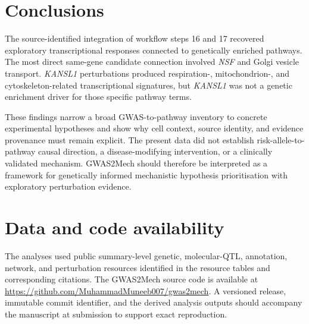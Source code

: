 \documentclass[11pt,a4paper]{article}
\begin{document}
\section{Conclusions}\label{subsec:discussion_conclusion}
The source-identified integration of workflow steps 16 and 17 recovered exploratory transcriptional responses connected to genetically enriched pathways. The most direct same-gene candidate connection involved \textit{NSF} and Golgi vesicle transport. \textit{KANSL1} perturbations produced respiration-, mitochondrion-, and cytoskeleton-related transcriptional signatures, but \textit{KANSL1} was not a genetic enrichment driver for those specific pathway terms.

These findings narrow a broad GWAS-to-pathway inventory to concrete experimental hypotheses and show why cell context, source identity, and evidence provenance must remain explicit. The present data did not establish risk-allele-to-pathway causal direction, a disease-modifying intervention, or a clinically validated mechanism. GWAS2Mech should therefore be interpreted as a framework for genetically informed mechanistic hypothesis prioritisation with exploratory perturbation evidence.

\section*{Data and code availability}
The analyses used public summary-level genetic, molecular-QTL, annotation, network, and perturbation resources identified in the resource tables and corresponding citations. The GWAS2Mech source code is available at \url{https://github.com/MuhammadMuneeb007/gwas2mech}. A versioned release, immutable commit identifier, and the derived analysis outputs should accompany the manuscript at submission to support exact reproduction.


\clearpage


\end{document}
